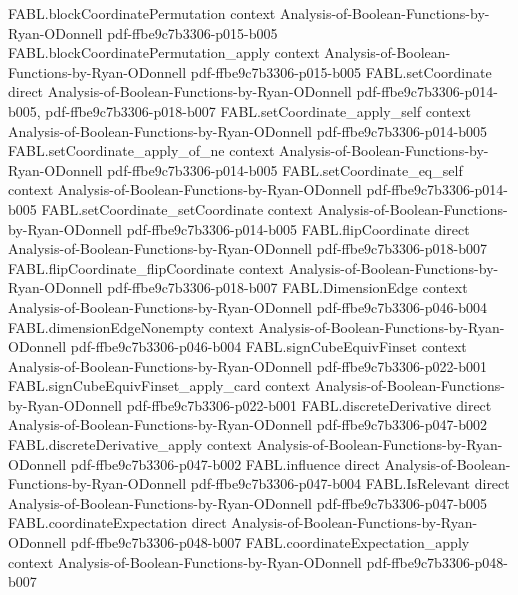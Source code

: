 \begin{theorem}
\proofstep
  {FABL.blockCoordinatePermutation}
  {context}
  {Analysis-of-Boolean-Functions-by-Ryan-ODonnell}
  {pdf-ffbe9c7b3306-p015-b005}
\proofstep
  {FABL.blockCoordinatePermutation_apply}
  {context}
  {Analysis-of-Boolean-Functions-by-Ryan-ODonnell}
  {pdf-ffbe9c7b3306-p015-b005}
\proofstep
  {FABL.setCoordinate}
  {direct}
  {Analysis-of-Boolean-Functions-by-Ryan-ODonnell}
  {pdf-ffbe9c7b3306-p014-b005,
    pdf-ffbe9c7b3306-p018-b007}
\proofstep
  {FABL.setCoordinate_apply_self}
  {context}
  {Analysis-of-Boolean-Functions-by-Ryan-ODonnell}
  {pdf-ffbe9c7b3306-p014-b005}
\proofstep
  {FABL.setCoordinate_apply_of_ne}
  {context}
  {Analysis-of-Boolean-Functions-by-Ryan-ODonnell}
  {pdf-ffbe9c7b3306-p014-b005}
\proofstep
  {FABL.setCoordinate_eq_self}
  {context}
  {Analysis-of-Boolean-Functions-by-Ryan-ODonnell}
  {pdf-ffbe9c7b3306-p014-b005}
\proofstep
  {FABL.setCoordinate_setCoordinate}
  {context}
  {Analysis-of-Boolean-Functions-by-Ryan-ODonnell}
  {pdf-ffbe9c7b3306-p014-b005}
\proofstep
  {FABL.flipCoordinate}
  {direct}
  {Analysis-of-Boolean-Functions-by-Ryan-ODonnell}
  {pdf-ffbe9c7b3306-p018-b007}
\proofstep
  {FABL.flipCoordinate_flipCoordinate}
  {context}
  {Analysis-of-Boolean-Functions-by-Ryan-ODonnell}
  {pdf-ffbe9c7b3306-p018-b007}
\proofstep
  {FABL.DimensionEdge}
  {context}
  {Analysis-of-Boolean-Functions-by-Ryan-ODonnell}
  {pdf-ffbe9c7b3306-p046-b004}
\proofstep
  {FABL.dimensionEdgeNonempty}
  {context}
  {Analysis-of-Boolean-Functions-by-Ryan-ODonnell}
  {pdf-ffbe9c7b3306-p046-b004}
\proofstep
  {FABL.signCubeEquivFinset}
  {context}
  {Analysis-of-Boolean-Functions-by-Ryan-ODonnell}
  {pdf-ffbe9c7b3306-p022-b001}
\proofstep
  {FABL.signCubeEquivFinset_apply_card}
  {context}
  {Analysis-of-Boolean-Functions-by-Ryan-ODonnell}
  {pdf-ffbe9c7b3306-p022-b001}
\proofstep
  {FABL.discreteDerivative}
  {direct}
  {Analysis-of-Boolean-Functions-by-Ryan-ODonnell}
  {pdf-ffbe9c7b3306-p047-b002}
\proofstep
  {FABL.discreteDerivative_apply}
  {context}
  {Analysis-of-Boolean-Functions-by-Ryan-ODonnell}
  {pdf-ffbe9c7b3306-p047-b002}
\proofstep
  {FABL.influence}
  {direct}
  {Analysis-of-Boolean-Functions-by-Ryan-ODonnell}
  {pdf-ffbe9c7b3306-p047-b004}
\proofstep
  {FABL.IsRelevant}
  {direct}
  {Analysis-of-Boolean-Functions-by-Ryan-ODonnell}
  {pdf-ffbe9c7b3306-p047-b005}
\proofstep
  {FABL.coordinateExpectation}
  {direct}
  {Analysis-of-Boolean-Functions-by-Ryan-ODonnell}
  {pdf-ffbe9c7b3306-p048-b007}
\proofstep
  {FABL.coordinateExpectation_apply}
  {context}
  {Analysis-of-Boolean-Functions-by-Ryan-ODonnell}
  {pdf-ffbe9c7b3306-p048-b007}

\end{theorem}
